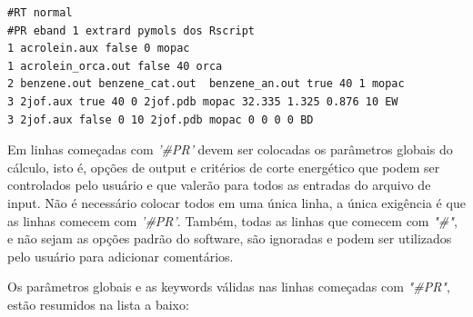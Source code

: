 \documentclass[a4paper,11pt]{refart}
\begin{document}
\hspace*{-\leftmarginwidth}
\begin{minipage}{\fullwidth}
\begin{lstlisting}[caption=Exemplo de input utilizado a partir da versão 1.2.,label={ls.pri2}]
#RT normal 
#PR eband 1 extrard pymols dos Rscript
1 acrolein.aux false 0 mopac 
1 acrolein_orca.out false 40 orca 
2 benzene.out benzene_cat.out  benzene_an.out true 40 1 mopac
3 2jof.aux true 40 0 2jof.pdb mopac 32.335 1.325 0.876 10 EW 
3 2jof.aux false 0 10 2jof.pdb mopac 0 0 0 0 BD
\end{lstlisting}
\end{minipage}

Em linhas começadas com \emph{'\#PR'} devem ser colocadas os parâmetros globais do cálculo, isto é, opções de output e critérios de corte energético que podem ser controlados pelo usuário e que valerão para todos as entradas do arquivo de input. Não é necessário colocar todos em uma única linha, a única exigência é que as linhas comecem com \emph{'\#PR'}. Também, todas as linhas que comecem com \emph{"\#"}, e não sejam as opções padrão do software, são ignoradas e podem ser utilizados pelo usuário para adicionar comentários. 

Os parâmetros globais e as keywords válidas nas linhas começadas com \emph{"\#PR"}, estão resumidos na lista a baixo: 
\end{document}
